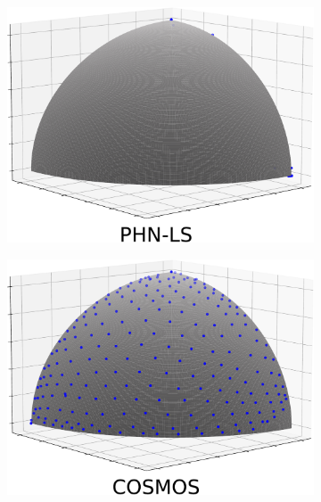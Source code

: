 \documentclass[letterpaper]{article} %
\begin{document}
\begin{figure}[!htb]
\centering
\begin{subfigure}[b]{0.24\textwidth}
\centering
\includegraphics[width=\textwidth]{figures/Toy_4_PHN-LS.pdf}
\end{subfigure}
\hfill
\begin{subfigure}[b]{0.24\textwidth}
\centering
\includegraphics[width=\textwidth]{figures/Toy_4_COSMOS.pdf}
\end{subfigure}
\hfill
\begin{subfigure}[b]{0.24\textwidth}
\centering

\end{subfigure}
\end{figure}
\end{document}
